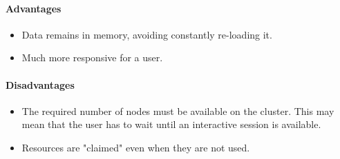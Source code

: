\paragraph{Advantages}

\begin{itemize}
\item Data remains in memory, avoiding constantly re-loading it.
\item Much more responsive for a user.
\end{itemize}

\paragraph{Disadvantages}

\begin{itemize}
\item The required number of nodes must be available on the cluster. This may mean that the user has to wait until an interactive session is available.
\item Resources are "claimed" even when they are not used. 
\end{itemize}


